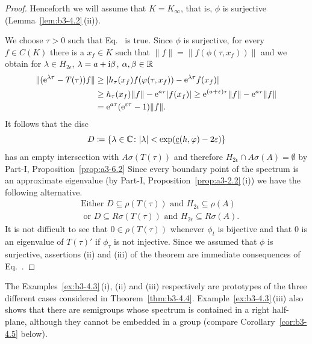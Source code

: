 \begin{proof}
	Henceforth we will assume that $K = K_{\infty}$, that is, $\phi$ is surjective (\cf Lemma~\ref{lem:b3-4.2}\,(ii)).
	
	We choose $\tau > 0$ such that Eq.~ is true.
	Since $\phi$ is surjective, for every $f \in C(K)$ there is a $x_{f} \in K$ such that $\|f\| = \|f(\phi(\tau,x_{f}))\|$ and we obtain for $\lambda \in H_{2\epsilon}$, $\lambda = a + \mathrm{i}\beta$, $\alpha,\beta \in \mathbb{R}$
	\begin{equation}\label{eq:b3-4.9}
		\begin{aligned}
			\|(\eu^{\lambda\tau} - T(\tau))f\| &\geq |h_{\tau}(x_{f})f(\phi(\tau,x_{f})) - \eu^{\lambda\tau}f(x_{f})| \\
			& \geq h_{\tau}(x_{f})\|f\| - \eu^{a\tau}|f(x_{f})| 
			 \geq \eu^{(a+\epsilon)\tau}\|f\| - \eu^{a\tau}\|f\| \\
			&= \eu^{a\tau}(\eu^{\epsilon\tau} - 1)\|f\|.
		\end{aligned}
	\end{equation}
	It follows that the disc 
    \[
    D \coloneq \{\lambda \in \C \colon |\lambda| < \exp(\underbar{c}(h,\phi)-2\epsilon)\}
    \]
    has an empty intersection with $A{\sigma}(T(\tau))$ and therefore $H_{2\epsilon}\cap A\sigma(A) = \emptyset$ by Part-I, Proposition~\ref{prop:a3-6.2}
	Since every boundary point of the spectrum is an approximate eigenvalue (by Part-I, Proposition~\ref{prop:a3-2.2}\,(i)) we have the following alternative.
	\begin{equation}\label{eq:b3-4.10}
		\begin{aligned}
		&\text{Either } D \subseteq \rho(T(\tau)) \text{ and } H_{2\epsilon} \subseteq \rho(A) \\
		&\text{ or } D \subseteq R{\sigma}(T(\tau)) \text{ and } H_{2\epsilon} \subseteq R{\sigma}(A).
	\end{aligned}
	\end{equation}
	It is not difficult to see that $0 \in \rho(T(\tau))$ whenever $\phi_{t}$ is bijective and that $0$ is an eigenvalue of\/ $T(\tau)'$ if\/ $\phi_{\tau}$ is not injective.
	Since we assumed that $\phi$ is surjective, assertions (ii) and (iii) of the theorem are immediate consequences of Eq.~.
\end{proof}
The Examples~\ref{ex:b3-4.3}\,(i), (ii) and (iii) respectively are prototypes of the three different cases considered in Theorem~\ref{thm:b3-4.4}.
Example~\ref{ex:b3-4.3}\,(iii) also shows that there are semigroups whose spectrum is contained in a right half-plane, although they cannot be embedded in a group (compare Corollary~\ref{cor:b3-4.5} below).

